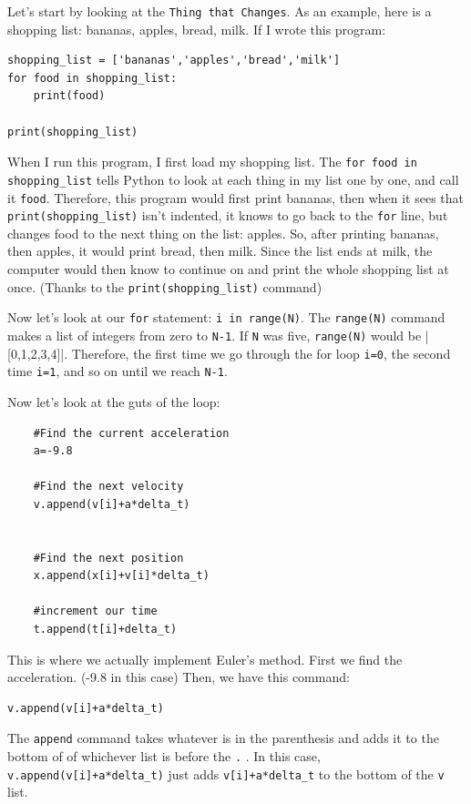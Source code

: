 \documentclass[twoside,11pt,ShortChapTitles]{BYUTextbook}
\begin{document}
Let's start by looking at the \lstinline[columns=fixed]!Thing that Changes!.   As an example, here is a shopping list: bananas, apples, bread, milk.  If I wrote this program:
\begin{lstlisting}
shopping_list = ['bananas','apples','bread','milk']
for food in shopping_list:
    print(food)

print(shopping_list)
\end{lstlisting}
When I run this program, I first load my shopping list.  The \lstinline[columns=fixed]!for food in shopping_list! tells Python to look at each thing in my list one by one, and call it \lstinline[columns=fixed]!food!.  Therefore, this program would first print bananas, then when it sees that \lstinline[columns=fixed]!print(shopping_list)! isn't indented, it knows to go back to the \lstinline[columns=fixed]!for! line, but changes food to the next thing on the list: apples.  So, after printing bananas, then apples, it would print bread, then milk.  Since the list ends at milk, the computer would then know to continue on and print the whole shopping list at once. (Thanks to the \lstinline[columns=fixed]!print(shopping_list)! command)

Now let's look at our \lstinline[columns=fixed]!for! statement: \lstinline[columns=fixed]!i in range(N)!.  The \lstinline[columns=fixed]!range(N)! command makes a list of integers from zero to \lstinline[columns=fixed]!N-1!.  If \lstinline[columns=fixed]!N! was five, \lstinline[columns=fixed]!range(N)! would be |[0,1,2,3,4]|.  Therefore, the first time we go through the for loop \lstinline[columns=fixed]!i=0!, the second time \lstinline[columns=fixed]!i=1!, and so on until we reach \lstinline[columns=fixed]!N-1!.

Now let's look at the guts of the loop:
\begin{lstlisting}
    #Find the current acceleration
    a=-9.8
    
    #Find the next velocity
    v.append(v[i]+a*delta_t)    
    
    
    #Find the next position
    x.append(x[i]+v[i]*delta_t)
    
    #increment our time
    t.append(t[i]+delta_t)
\end{lstlisting}

This is where we actually implement Euler's method.  First we find the acceleration. (-9.8 in this case) Then, we have this command:
\begin{lstlisting}
v.append(v[i]+a*delta_t)
\end{lstlisting}
The \lstinline[columns=fixed]!append! command takes whatever is in the parenthesis and adds it to the bottom of of whichever list is before the \lstinline[columns=fixed]!.! . In this case, \lstinline[columns=fixed]!v.append(v[i]+a*delta_t)! just adds \lstinline[columns=fixed]!v[i]+a*delta_t! to the bottom of the \lstinline[columns=fixed]!v! list.  
  
\end{document}
